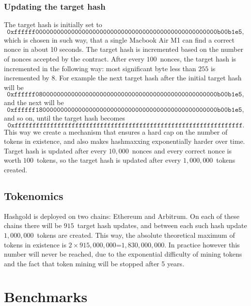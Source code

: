 \documentclass[12pt, a4paper]{article}
\newcommand{\incrementPeriodNonces}{$10,000$}
\newcommand{\rewardPerNonce}{$100$}
\newcommand{\tokensPerHashUpdate}{$1,000,000$}
\newcommand{\totalNumberofIncremensPerChain}{$915$}
\newcommand{\tokenHardCapPerChain}{$915,000,000$}
\newcommand{\tokenHardCapTotal}{$1,830,000,000$}
\newcommand{\tokenMiningStopped}{5 years}
\begin{document}
\subsubsection{Updating the target hash}
The target hash is initially set to
\begin{equation*}
\texttt{0xffffff000000000000000000000000000000000000000000000000000b00b1e5},
\end{equation*}
which is chosen in such way, that a single Macbook Air M1 can find a correct nonce in about 10 seconds. The target hash is incremented based on the number of nonces accepted by the contract. After every \rewardPerNonce~nonces, the target hash is incremented in the following way: most significant byte less than $255$ is incremented by $8$. For example the next target hash after the initial target hash will be
\begin{equation*}
\texttt{0xffffff080000000000000000000000000000000000000000000000000b00b1e5},
\end{equation*}
and the next will be
\begin{equation*}
\texttt{0xffffff180000000000000000000000000000000000000000000000000b00b1e5},
\end{equation*}
and so on, until the target hash becomes
\begin{equation*}
\texttt{0xffffffffffffffffffffffffffffffffffffffffffffffffffffffffffffffff}.
\end{equation*}
This way we create a mechanism that ensures a hard cap on the number of tokens in existence, and also makes hashmaxxing exponentially harder over time. Target hash is updated after every \incrementPeriodNonces~nonces and every correct nonce is worth \rewardPerNonce~tokens, so the target hash is updated after every
\tokensPerHashUpdate~tokens created.
\subsection{Tokenomics}
Hashgold is deployed on two chains: Ethereum and Arbitrum. On each of these chains there will be \totalNumberofIncremensPerChain~target hash updates, and between each such hash update \tokensPerHashUpdate~tokens are created. 
This way, the absolute theoretical maximum of tokens in existence is $2\times$\tokenHardCapPerChain=\tokenHardCapTotal. In practice however this number will never be reached, due to the exponential difficulty of mining tokens and the fact that token mining will be stopped after \tokenMiningStopped.

\newpage
\section{Benchmarks}
\end{document}
